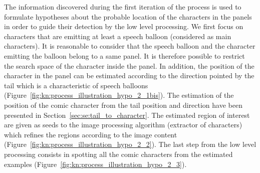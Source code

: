 The information discovered during the first iteration of the process is used to formulate hypotheses about the probable location of the characters in the panels in order to guide their detection by the low level processing.
We first focus on characters that are emitting at least a speech balloon (considered as main characters).
It is reasonable to consider that the speech balloon and the character emitting the balloon belong to a same panel.
It is therefore possible to restrict the search space of the character inside the panel.
In addition, the position of the character in the panel can be estimated according to the direction pointed by the tail which is a characteristic of speech balloons (Figure~\ref{fig:kn:process_illustration_hypo_2_1bis}).
The estimation of the position of the comic character from the tail position and direction have been presented in Section~\ref{sec:se:tail_to_character}.
The estimated region of interest are given as seeds to the image processing algorithm (extractor of characters) which refines the regions according to the image content (Figure~\ref{fig:kn:process_illustration_hypo_2_2}).
The last step from the low level processing consists in spotting all the comic characters from the estimated examples (Figure~\ref{fig:kn:process_illustration_hypo_2_3}).



